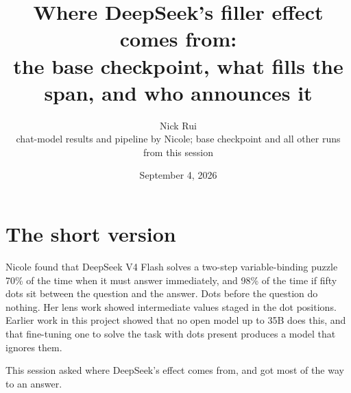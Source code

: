 \documentclass[11pt]{article}
\title{Where DeepSeek's filler effect comes from:\\ the base checkpoint, what fills the span, and who announces it}
\author{Nick Rui \\ \small chat-model results and pipeline by Nicole; base checkpoint and all other runs from this session}
\date{September 4, 2026}
\begin{document}
\sloppy
\maketitle

\section*{The short version}

Nicole found that DeepSeek V4 Flash solves a two-step variable-binding puzzle 70\% of the time when it must answer immediately, and 98\% of the time if fifty dots sit between the question and the answer. Dots before the question do nothing. Her lens work showed intermediate values staged in the dot positions. Earlier work in this project showed that no open model up to 35B does this, and that fine-tuning one to solve the task with dots present produces a model that ignores them.

This session asked where DeepSeek's effect comes from, and got most of the way to an answer.
\end{document}
